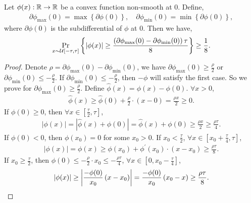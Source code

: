 \begin{lem}
\label{lem:non_smooth_convex}
	Let $\phi(x) : {\mathbb{R}} \to {\mathbb{R}}$ be a convex function non-smooth at $0$. Define,
\begin{equation*}
\begin{split}
	\partial\phi_{\max}{(0)} = \max\left\{ \partial\phi(0) \right\}, \quad \partial\phi_{\min}{(0)} = \min\left\{ \partial\phi(0) \right\},
\end{split}
\end{equation*}	
where $\partial\phi(0)$ is the subdifferential of $\phi$ at $0$. Then we have,
\begin{equation*}
\begin{split}
	\operatorname*{Pr}\limits_{x \sim {\mathcal{U}}[-\tau, \tau]}\left\{ \left| \phi(x) \right| \ge \frac{ \left( \partial\phi_{\max}{(0)} - \partial\phi_{\min}{(0)} \right) \tau}{8} \right\} \ge \frac{1}{8}.
\end{split}
\end{equation*}	
\end{lem}
\begin{proof}
	Denote $\rho = \partial\phi_{\max}{(0)} - \partial\phi_{\min}{(0)}$, we have $\partial\phi_{\max}{(0)} \ge \frac{\rho}{2}$ or $\partial\phi_{\min}{(0)} \le - \frac{\rho}{2}$. If $\partial\phi_{\min}{(0)} \le - \frac{\rho}{2}$, then $-\phi$ will satisfy the first case. So we prove for $\partial\phi_{\max}{(0)} \ge \frac{\rho}{2}$. Define $\hat{\phi}(x) = \phi(x) - \phi(0)$. $\forall x > 0$,
\begin{equation*}
\begin{split}
	\hat{\phi}(x) \ge \hat{\phi}(0) + \frac{\rho}{2} \cdot \left( x - 0\right) = \frac{\rho x}{2} \ge 0.
\end{split}
\end{equation*}
If $\phi(0) \ge 0$, then $\forall x \in \left[\frac{\tau}{2}, \tau \right]$,
\begin{equation*}
\begin{split}
	\left| \phi(x) \right| = \left| \hat{\phi}(x) + \phi(0) \right| = \hat{\phi}(x) + \phi(0) \ge \frac{\rho x}{2} \ge \frac{\rho \tau}{4}.
\end{split}
\end{equation*}
If $\phi(0) < 0$, then $\phi(x_0) = 0$ for some $x_0 > 0$. If $x_0 < \frac{\tau}{2}$, $\forall x \in \left[x_0 + \frac{\tau}{4}, \tau \right]$,
\begin{equation*}
\begin{split}
	\left| \phi(x) \right| =  \phi(x) \ge \phi(x_0) + \phi^\prime(x_0) \cdot \left( x - x_0 \right) \ge \frac{\rho \tau}{8}.
\end{split}
\end{equation*}
If $x_0 \ge \frac{\tau}{2}$, then $\phi(0) \le - \frac{\rho}{2} \cdot x_0 \le - \frac{\rho\tau}{4}$, $\forall x \in \left[0, x_0 - \frac{\tau}{4} \right]$,
\begin{equation*}
	\left| \phi(x) \right| \ge \left| \frac{-\phi(0)}{x_0} \left( x - x_0 \right) \right| = \frac{-\phi(0)}{x_0} \left( x_0 - x \right) \ge \frac{\rho\tau}{8}. \qedhere
\end{equation*}
\end{proof}

